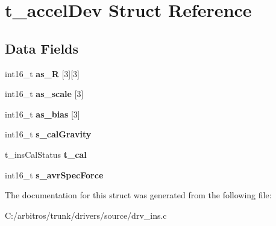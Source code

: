 \hypertarget{structt__accel_dev}{\section{t\-\_\-accel\-Dev Struct Reference}
\label{structt__accel_dev}
}
\subsection*{Data Fields}
\begin{DoxyCompactItemize}
\item 
\hypertarget{structt__accel_dev_ad7daca491dc2ace488c7fd26eee4c5e9}{int16\-\_\-t {\bfseries as\-\_\-\-R} \mbox{[}3\mbox{]}\mbox{[}3\mbox{]}}\label{structt__accel_dev_ad7daca491dc2ace488c7fd26eee4c5e9}

\item 
\hypertarget{structt__accel_dev_a090c73eef857227542434acce66453fd}{int16\-\_\-t {\bfseries as\-\_\-scale} \mbox{[}3\mbox{]}}\label{structt__accel_dev_a090c73eef857227542434acce66453fd}

\item 
\hypertarget{structt__accel_dev_ab09e9163fcbdd1f8df41f93844da2d68}{int16\-\_\-t {\bfseries as\-\_\-bias} \mbox{[}3\mbox{]}}\label{structt__accel_dev_ab09e9163fcbdd1f8df41f93844da2d68}

\item 
\hypertarget{structt__accel_dev_a7a5f0992351377907af87663257e1957}{int16\-\_\-t {\bfseries s\-\_\-cal\-Gravity}}\label{structt__accel_dev_a7a5f0992351377907af87663257e1957}

\item 
\hypertarget{structt__accel_dev_a5b8c77544b001e373f59189f0fbe6878}{t\-\_\-ins\-Cal\-Status {\bfseries t\-\_\-cal}}\label{structt__accel_dev_a5b8c77544b001e373f59189f0fbe6878}

\item 
\hypertarget{structt__accel_dev_a9b8095efdf7231ca020b21028fdd1916}{int16\-\_\-t {\bfseries s\-\_\-avr\-Spec\-Force}}\label{structt__accel_dev_a9b8095efdf7231ca020b21028fdd1916}

\end{DoxyCompactItemize}


The documentation for this struct was generated from the following file\-:\begin{DoxyCompactItemize}
\item 
C\-:/arbitros/trunk/drivers/source/drv\-\_\-ins.\-c\end{DoxyCompactItemize}
